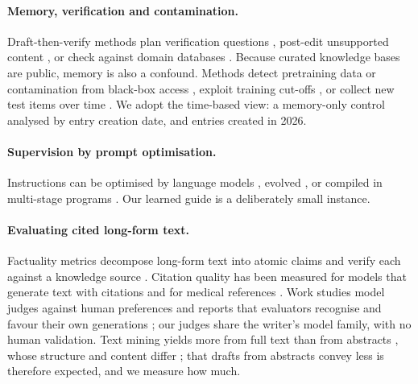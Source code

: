 \documentclass{article} %
\begin{document}
\paragraph{Memory, verification and contamination.}
Draft-then-verify methods plan verification questions \citep{dhuliawala2024chainofverification}, post-edit unsupported content \citep{Gao2022RarrResearching}, or check against domain databases \citep{wang2025geneagent}. Because curated knowledge bases are public, memory is also a confound. Methods detect pretraining data or contamination from black-box access \citep{Shi2023DetectingPretraining,oren2024proving,golchin2024time,Golchin2025DataContamination}, exploit training cut-offs \citep{Roberts2023DataContamination}, or collect new test items over time \citep{Jain2024LivecodebenchHolistic,White2024LivebenchChallenging}. We adopt the time-based view: a memory-only control analysed by entry creation date, and entries created in 2026.

\paragraph{Supervision by prompt optimisation.}
Instructions can be optimised by language models \citep{Zhou2022LargeLanguage,Pryzant2023AutomaticPrompt,Yang2023LargeLanguage}, evolved \citep{Guo2023EvopromptConnecting,Fernando2023PromptbreederSelfreferential,agrawal2026gepa}, or compiled in multi-stage programs \citep{Khattab2023DspyCompiling,Opsahlong2024OptimizingInstructions}. Our learned guide is a deliberately small instance.

\paragraph{Evaluating cited long-form text.}
Factuality metrics decompose long-form text into atomic claims and verify each against a knowledge source \citep{min2023factscore,wei2024longform}. Citation quality has been measured for models that generate text with citations \citep{gao2023enabling} and for medical references \citep{wu2025automated}. Work studies model judges against human preferences \citep{zheng2023judging,shankar2024who} and reports that evaluators recognise and favour their own generations \citep{panickssery2024llm}; our judges share the writer's model family, with no human validation. Text mining yields more from full text than from abstracts \citep{Westergaard2018ComprehensiveQuantitative}, whose structure and content differ \citep{Cohen2010StructuralContent}; that drafts from abstracts convey less is therefore expected, and we measure how much.
\end{document}
